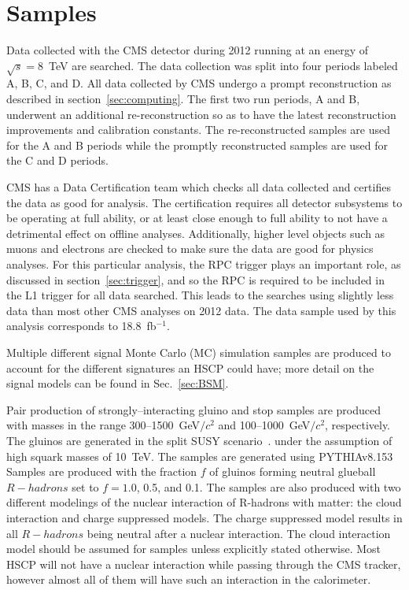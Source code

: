 \section{Samples \label{sec:samples}}

Data collected with the CMS detector during 2012 running at an energy of $\sqrt{s}=8$~TeV are searched. The data collection was split into four periods labeled A, B, C, and D.
All data collected by CMS undergo a prompt reconstruction as described in section~\ref{sec:computing}. The first two run periods, A and B, underwent an additional
re-reconstruction so as to have the latest reconstruction improvements and calibration constants. The re-reconstructed samples are used for the A and B periods while the promptly
reconstructed samples are used for the C and D periods.

CMS has a Data Certification team which checks all data collected and certifies the data as good for analysis. The certification requires all detector subsystems to be
operating at full ability, or at least close enough to full ability to not have a detrimental effect on offline analyses. Additionally, higher level objects such as muons
and electrons are checked to make sure the data are good for physics analyses. For this particular analysis, the RPC trigger plays an important role, as discussed in
section~\ref{sec:trigger}, and so the RPC is required to be included in the L1 trigger for all data searched. This leads to the searches using slightly less data
than most other CMS analyses on 2012 data. The data sample used by this analysis corresponds to 18.8~fb$^{-1}$.

Multiple different signal Monte Carlo (MC) simulation samples are produced to account for the different signatures an HSCP could have;
more detail on the signal models can be found in Sec.~\ref{sec:BSM}.

Pair production of strongly--interacting gluino and stop samples are produced with
masses in the range 300--1500~GeV$/c^2$ and 100--1000~GeV$/c^2$, respectively.
The gluinos are generated in the split SUSY scenario~\cite{ArkaniHamed:2004fb, Giudice:2004tc}. 
under the assumption of high squark masses of 10~TeV. The samples are generated using PYTHIAv8.153~\cite{Sjostrand:2007gs}
Samples are produced with the fraction $f$ of gluinos forming neutral glueball $R-hadrons$ set to $f=1.0$, 0.5, and 0.1.
The samples are also produced with two different modelings of the nuclear interaction of R-hadrons with matter: the cloud interaction and charge suppressed models.
The charge suppressed model results in all $R-hadrons$ being neutral after a nuclear interaction.
The cloud interaction model should be assumed for samples unless explicitly stated otherwise.
Most HSCP will not have a nuclear interaction while passing through the CMS tracker, however almost all of them will have such an interaction in the calorimeter.

